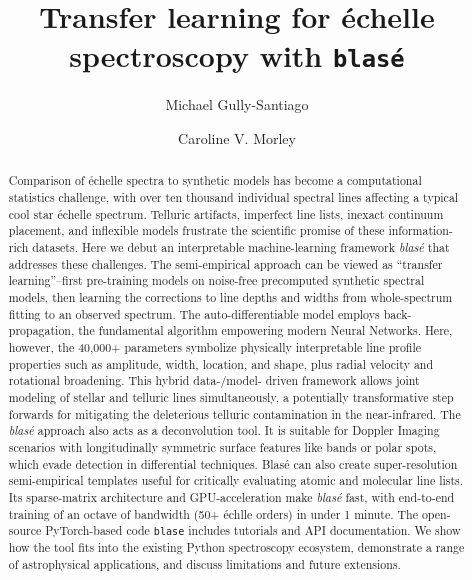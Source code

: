 \documentclass[modern]{aastex631}
\begin{document}
\title{Transfer learning for \'echelle spectroscopy with \texttt{blas\'e}}

\author{Michael Gully-Santiago}

\author{Caroline V. Morley}

\begin{abstract}

    Comparison of \'echelle spectra to synthetic models has become a computational statistics challenge, with over ten thousand individual spectral lines affecting a typical cool star \'echelle spectrum.  Telluric artifacts, imperfect line lists, inexact continuum placement, and inflexible models frustrate the scientific promise of these information-rich datasets.  Here we debut an interpretable machine-learning framework \emph{blas\'e} that addresses these challenges.  The semi-empirical approach can be viewed as ``transfer learning''--first pre-training models on noise-free precomputed synthetic spectral models, then learning the corrections to line depths and widths from whole-spectrum fitting to an observed spectrum.  The auto-differentiable model employs back-propagation, the fundamental algorithm empowering modern Neural Networks. Here, however, the 40,000+ parameters symbolize physically interpretable line profile properties such as amplitude, width, location, and shape, plus radial velocity and rotational broadening.  This hybrid data-/model- driven framework allows joint modeling of stellar and telluric lines simultaneously, a potentially transformative step forwards for mitigating the deleterious telluric contamination in the near-infrared.  The \emph{blas\'e} approach also acts as a deconvolution tool. It is suitable for Doppler Imaging scenarios with longitudinally symmetric surface features like bands or polar spots, which evade detection in differential techniques.  Blas\'e can also create super-resolution semi-empirical templates useful for critically evaluating atomic and molecular line lists.  Its sparse-matrix architecture and GPU-acceleration make \emph{blas\'e} fast, with end-to-end training of an octave of bandwidth (50+ \'echlle orders) in under 1 minute.  The open-source PyTorch-based code \texttt{blase} includes tutorials and API documentation.  We show how the tool fits into the existing Python spectroscopy ecosystem, demonstrate a range of astrophysical applications, and discuss limitations and future extensions.


\end{abstract}
\end{document}

